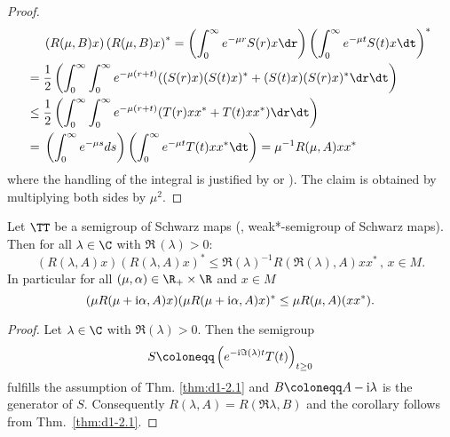 \begin{proof}
\begin{align*}
	 \phantom{=}{}& \left( R(\mu,B)x  \right) \left( R(\mu,B)x \right)^{*} 
		= \left( \int_{0}^\infty e^{-\mu r}S(r)x \dr \right)
			\left( \int_{0}^\infty e^{-\mu t}S(t)x \dt \right)^{*}   \\
	={}& \frac{1}{2} \left( \int_{0}^\infty \int_{0}^\infty e^{-\mu(r+t)} ((S(r)x)(S(t)x)^{*}  
			+ (S(t)x)(S(r)x)^{*}  \dr \dt \right) \\
	\leq{}& \frac{1}{2} \left(\int_{0}^\infty \int_{0}^\infty e^{-\mu(r+t)} (T(r)xx^{*} + T(t)xx^{*})  			\dr \dt \right)\\
	={}& \left( \int_{0}^\infty e^{-\mu s} ds \right)
			\left( \int_{0}^\infty e^{-\mu t}T(t)xx^{*} \dt \right) 
				= \mu^{-1}R(\mu,A)xx^{*}
\end{align*}
where the handling of the integral is justified by \citet[Chap. V, §8, n° 4, Proposition 9]{bourbaki:1955} or \cite{bourbaki:2004a}).
The claim is obtained by multiplying both sides by $\mu^{2} $. 
\end{proof}
\begin{corollary}\label{cor:d1-2.2}
Let $ \TT $ be a semigroup of Schwarz maps (\resp, weak*-semigroup of Schwarz maps).
Then for all $ \lambda \in \C $ with $ \Re \, (\lambda) > 0 $:
\[
	\left( R(\lambda,A)x \right) \left( R(\lambda,A)x \right)^{*} 
		\leq \Re(\lambda)^{-1} R(\Re(\lambda),A)xx^{*} \, , \, x \in M .
\]
In particular for all $ (\mu,\alpha) \in \R_{+} \times \R $ and $ x \in M $
\[
(\mu R(\mu+\mathrm{i} \alpha,A)x)(\mu R(\mu + \mathrm{i} \alpha,A)x)^{*} \leq \mu R(\mu,A)(xx^{*}).
\]
\end{corollary}
\begin{proof}
Let $ \lambda \in \C $ with $ \Re(\lambda) > 0 $.
Then the semigroup
\[
S \coloneqq \left(e^{- \I \Im (\lambda) t }T(t) \right)_{t \geq 0}
\]
fulfills the assumption of  Thm. \ref{thm:d1-2.1} and $ B \coloneqq A - \I \lambda $ is the generator of $ S $.
Consequently $ R(\lambda,A) = R(\Re\lambda,B) $ and the corollary follows from Thm.~\ref{thm:d1-2.1}.
\end{proof}
